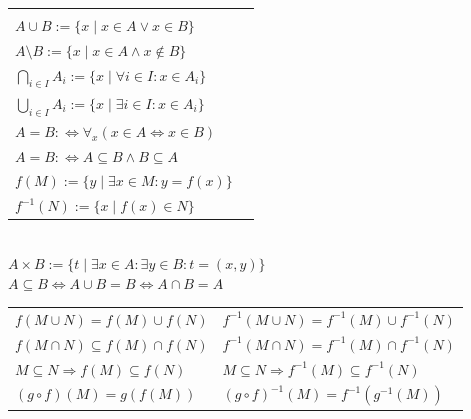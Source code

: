 \documentclass[a4paper,10pt,fleqn,twoside,twocolumn,dvipdfmx]{scrartcl}
\begin{document}
\begin{tabular}{@{}l@{\;\,}|@{\;\;}l}
\makecell[lt]{
$A\cap B := \{x\mid x\in A\land x\in B\}$\\
$A\cup B := \{x\mid x\in A\lor x\in B\}$\\
$A\setminus B := \{x\mid x\in A\land x\notin B\}$\\
$\bigcap_{i\in I} A_i := \{x\mid \forall i{\in}I\colon x{\in}A_i\}$\\
$\bigcup_{i\in I} A_i := \{x\mid \exists i{\in}I\colon x{\in}A_i\}$
}
&\makecell[lt]{
$A\subseteq B :\Leftrightarrow \forall_{\!x}(x\in A\Rightarrow x\in B)$\\
$A=B :\Leftrightarrow \forall_{\!x}(x\in A\Leftrightarrow x\in B)$\\
$A=B :\Leftrightarrow A\subseteq B\land B\subseteq A$\\
$f(M) := \{y\mid\exists x{\in}M\colon y{=}f(x)\}$\\
$f^{-1}(N) := \{x\mid f(x)\in N\}$
}
\end{tabular}\\
$A\times B := \{t\mid \exists x{\in}A\colon \exists y{\in}B\colon t=(x,y)\}$\\
$A\subseteq B\Leftrightarrow A\cup B=B\Leftrightarrow A\cap B=A$\\[2pt]
\begin{tabular}{@{}l@{\;\,}|@{\;\,}l}
$f(M\cup N) = f(M)\cup f(N)$ & $f^{-1}(M\cup N) = f^{-1}(M)\cup f^{-1}(N)$\\
$f(M\cap N) \subseteq f(M)\cap f(N)$ & $f^{-1}(M\cap N) = f^{-1}(M)\cap f^{-1}(N)$\\
$M\subseteq N\Rightarrow f(M)\subseteq f(N)$ & $M\subseteq N\Rightarrow f^{-1}(M)\subseteq f^{-1}(N)$\\
$(g\circ f)(M) = g(f(M))$ & $(g\circ f)^{-1}(M) = f^{-1}(g^{-1}(M))$
\end{tabular}

\end{document}
